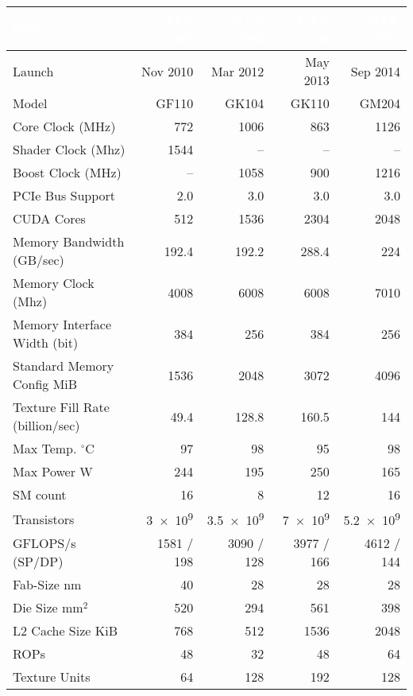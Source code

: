 \documentclass[a4paper,10pt,landscape]{article}
\begin{document}
\begin{tabular}{lrrrr}
\toprule
\rowcolor{black}
\textcolor{white}{GPU} & \textcolor{white}{GTX 580} & \textcolor{white}{GTX 680} & \textcolor{white}{GTX 780} & \textcolor{white}{GTX 980} \\
\midrule
Launch & Nov 2010 & Mar 2012 & May 2013 & Sep 2014 \\
Model & GF110 & GK104 & GK110 & GM204 \\
Core Clock (MHz)  & \num{772} & \num{1006} & \num{863} & \num{1126} \\
Shader Clock (Mhz) & \num{1544} & -- & -- & -- \\
Boost Clock (MHz)  & -- & \num{1058} & \num{900} & \num{1216} \\
PCIe Bus Support  & \num{2.0} & \num{3.0} & \num{3.0} & \num{3.0} \\
CUDA Cores  & \num{512} & \num{1536} & \num{2304} & \num{2048} \\
Memory Bandwidth (GB/sec)  & \num{192.4} & \num{192.2} & \num{288.4} & \num{224} \\
Memory Clock (Mhz) & \num{4008} & \num{6008} & \num{6008} & \num{7010} \\
Memory Interface Width (bit) & \num{384} & \num{256} & \num{384} & \num{256} \\
Standard Memory Config MiB & \num{1536} & \num{2048} & \num{3072} & \num{4096} \\
Texture Fill Rate (billion/sec) & \num{49.4} & \num{128.8} & \num{160.5} & \num{144} \\
Max Temp. $^\circ$C & \num{97} & \num{98} & \num{95} & \num{98} \\
Max Power W & \num{244} & \num{195} & \num{250} & \num{165} \\
SM count & \num{16} & \num{8} & \num{12} & \num{16} \\
Transistors & \num{3e+9} & \num{3.5e+9} & \num{7e+9} & \num{5.2e+9} \\
GFLOPS/s (SP/DP) & \num{1581} / \num{198} & \num{3090} / \num{128} & \num{3977} / \num{166} & \num{4612} / \num{144} \\
Fab-Size nm & \num{40} & \num{28} & \num{28} & \num{28} \\
Die Size mm$^{\num{2}}$ & \num{520} & \num{294} & \num{561} & \num{398} \\
L2 Cache Size KiB & \num{768} & \num{512} & \num{1536} & \num{2048} \\
ROPs & \num{48} & \num{32} & \num{48} & \num{64} \\
Texture Units & \num{64} & \num{128} & \num{192} & \num{128} \\
\bottomrule
\end{tabular}
\end{document}
